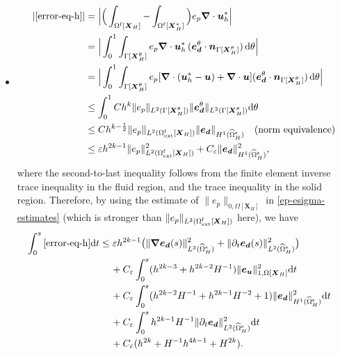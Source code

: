 \documentclass[11pt,reqno]{amsart}
\theoremstyle{definition}
\theoremstyle{plain}
\numberwithin{theorem}{section}
\numberwithin{proposition}{section}
\numberwithin{lemma}{section}
\numberwithin{equation}{section}
\newcommand{\bs}[1]{\boldsymbol{#1}}
\newcommand{\uu}[1]  {{\bs{#1}} }
\newcommand{\dep}{{{\bs{d}}}}
\newcommand{\grad}   { \uu{\nabla}    }
\def\d{\mathrm{d}}
\renewcommand{\(}{\bigl(}
\renewcommand{\)}{\bigr)}
\begin{document}
\begin{itemize}[leftmargin=20pt]
\item
\begin{align}
| \eqref{error-eq-h} |
&= \Big| \Big( \int_{\Omega^{\rm f}[\bs X_H]} - \int_{\Omega^{\rm f}[\bs X_H^*]} \Big) e_p \grad\cdot {\bs u}_h^* \Big| \notag\\
&= \Big|\int_0^1 \int_{\Gamma[\bs X_H^\theta]} e_p  \grad\cdot {\bs u}_h^*\, ({\bs e}_\dep^\theta\cdot {\bs n}_{\Gamma[{\bs X}_H^\theta]}) \, \d\theta \Big| \notag\\
&= \Big|\int_0^1 \int_{\Gamma[\bs X_H^\theta]} e_p  [\grad\cdot ({\bs u}_h^*-{\bs u}) + \grad\cdot{\bs u} ] ({\bs e}_\dep^\theta\cdot {\bs n}_{\Gamma[{\bs X}_H^\theta]}) \,  \d\theta \Big| \notag\\ 
&\le \int_0^1 Ch^k \| e_p \|_{L^2(\Gamma[\bs X_H^\theta])} \|{\bs e}_\dep ^\theta \|_{L^2(\Gamma[\bs X_H^\theta])} \d\theta \notag\\
&\le C h^{k-\frac12} \| e_p \|_{L^2(\Omega^{\rm f}_{\rm ext}[{\bs X}_H])} \| {\bs e}_\dep\|_{H^1(\widehat{\Omega}^{\rm s}_H)} 
\quad\mbox{(norm equivalence)} \notag\\
&\le  \varepsilon h^{2k-1}\| e_p \|_{L^2(\Omega^{\rm f}_{\rm ext}[{\bs X}_H])}^2  
+ C_{\varepsilon} \| {\bs e}_\dep\|_{H^1(\widehat{\Omega}^{\rm s}_H)}^2 ,
\end{align}
where the second-to-last inequality follows from the finite element inverse trace inequality in the fluid region, and the trace inequality in the solid region. Therefore, by using the estimate of $\| e_p \|_{0,\Omega[{\bs X}_H]}$ in \eqref{ep-esigma-estimates} (which is stronger than $\| e_p \|_{L^2(\Omega^{\rm f}_{\rm ext}[{\bs X}_H])}$ here), we have 
\begin{align}
\int_0^s \eqref{error-eq-h} \d t 
&\le  
\varepsilon h^{2k-1}
\big( \|\grad{\bs e}_{\bs d}(s)\|_{L^2(\widehat\Omega^{\rm s}_H)}^2 + \|\partial_t{\bs e}_{\bs d}(s)\|_{L^2(\widehat\Omega^{\rm s}_H)}^2 \big)\notag\\
&\quad\, 
+ C_\varepsilon \int_0^s (h^{2k-3}+h^{2k-2}H^{-1})\| {\bs e}_{\bs u}  \|_{1,\Omega[{\bs X}_H]}^2  \d t \notag\\
&\quad\, 
+ C_\varepsilon \int_0^s (h^{2k-2}H^{-1}+h^{2k-1}H^{-2}+1)\|{\bs e}_\dep\|_{H^1(\widehat{\Omega}^{\rm s}_H)}^2 \d t \notag\\
&\quad\, 
+ C_\varepsilon \int_0^s h^{2k-1}H^{-1}\|\partial_t{\bs e}_\dep\|_{L^2(\widehat{\Omega}^{\rm s}_H)}^2 \d t \notag\\
&\quad\, 
+ C_\varepsilon (h^{2k} + H^{-1}h^{4k-1} + H^{2k}) . 
&\end{align}


\end{itemize}
\end{document}
